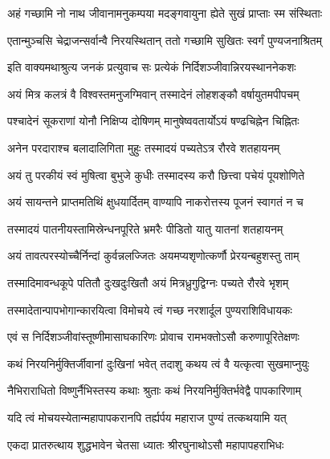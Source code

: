 \twolineshloka
{अहं गच्छामि नो नाथ जीवानामनुकम्पया}
{मदङ्गवायुना ह्येते सुखं प्राप्ताः स्म संस्थिताः}%

\twolineshloka
{एतान्मुञ्चसि चेद्राजन्सर्वान्वै निरयस्थितान्}
{ततो गच्छामि सुखितः स्वर्गं पुण्यजनाश्रितम्}%


\twolineshloka
{इति वाक्यमथाश्रुत्य जनकं प्रत्युवाच सः}
{प्रत्येकं निर्दिशञ्जीवान्निरयस्थाननेकशः}%


\twolineshloka
{अयं मित्र कलत्रं वै विश्वस्तमनुजग्मिवान्}
{तस्मादेनं लोहशङ्कौ वर्षायुतमपीपचम्}%

\twolineshloka
{पश्चादेनं सूकराणां योनौ निक्षिप्य दोषिणम्}
{मानुषेष्ववतार्योऽयं षण्ढचिह्नेन चिह्नितः}%

\twolineshloka
{अनेन परदाराश्च बलादालिगिता मुहुः}
{तस्मादयं पच्यतेऽत्र रौरवे शतहायनम्}%

\twolineshloka
{अयं तु परकीयं स्वं मुषित्वा बुभुजे कुधीः}
{तस्मादस्य करौ छित्त्वा पचेयं पूयशोणिते}%

\twolineshloka
{अयं सायन्तने प्राप्तमतिथिं क्षुधयार्दितम्}
{वाण्यापि नाकरोत्तस्य पूजनं स्वागतं न च}%

\twolineshloka
{तस्मादयं पातनीयस्तामिस्रेन्धनपूरिते}
{भ्रमरैः पीडितो यातु यातनां शतहायनम्}%

\twolineshloka
{अयं तावत्परस्योच्चैर्निन्दां कुर्वन्नलज्जितः}
{अयमप्यशृणोत्कर्णौ प्रेरयन्बहुशस्तु ताम्}%

\twolineshloka
{तस्मादिमावन्धकूपे पतितौ दुःखदुःखितौ}
{अयं मित्रध्रुगुद्विग्नः पच्यते रौरवे भृशम्}%

\twolineshloka
{तस्मादेतान्पापभोगान्कारयित्वा विमोचये}
{त्वं गच्छ नरशार्दूल पुण्यराशिविधायकः}%


\twolineshloka
{एवं स निर्दिशञ्जीवांस्तूष्णीमासाघकारिणः}
{प्रोवाच रामभक्तोऽसौ करुणापूरितेक्षणः}%


\twolineshloka
{कथं निरयनिर्मुक्तिर्जीवानां दुःखिनां भवेत्}
{तदाशु कथय त्वं वै यत्कृत्वा सुखमाप्नुयुः}%


\twolineshloka
{नैभिराराधितो विष्णुर्नैभिस्तस्य कथाः श्रुताः}
{कथं निरयनिर्मुक्तिर्भवेद्वै पापकारिणाम्}%

\twolineshloka
{यदि त्वं मोचयस्येतान्महापापकरानपि}
{तर्ह्यर्पय महाराज पुण्यं तत्कथयामि यत्}%

\twolineshloka
{एकदा प्रातरुत्थाय शुद्धभावेन चेतसा}
{ध्यातः श्रीरघुनाथोऽसौ महापापहराभिधः}%

